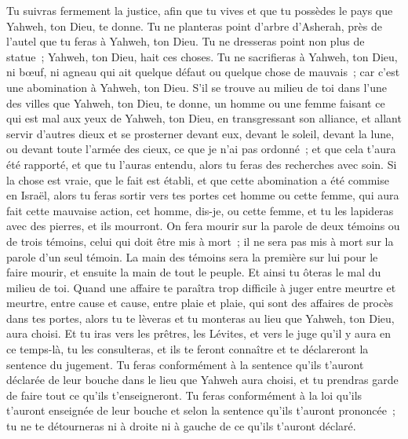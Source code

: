 \begin{multicols}{2}
Tu suivras fermement la justice, afin que tu vives et que tu possèdes le pays que Yahweh, ton Dieu, te donne.
Tu ne planteras point d'arbre d'Asherah, près de l'autel que tu feras à Yahweh, ton Dieu.
Tu ne dresseras point non plus de statue~; Yahweh, ton Dieu, hait ces choses.
\VerseOne{}Tu ne sacrifieras à Yahweh, ton Dieu, ni bœuf, ni agneau qui ait quelque défaut ou quelque chose de mauvais~; car c'est une abomination à Yahweh, ton Dieu.
S'il se trouve au milieu de toi dans l'une des villes que Yahweh, ton Dieu, te donne, un homme ou une femme faisant ce qui est mal aux yeux de Yahweh, ton Dieu, en transgressant son alliance,
et allant servir d'autres dieux et se prosterner devant eux, devant le soleil, devant la lune, ou devant toute l'armée des cieux, ce que je n'ai pas ordonné~;
et que cela t'aura été rapporté, et que tu l'auras entendu, alors tu feras des recherches avec soin. Si la chose est vraie, que le fait est établi, et que cette abomination a été commise en Israël,
alors tu feras sortir vers tes portes cet homme ou cette femme, qui aura fait cette mauvaise action, cet homme, dis-je, ou cette femme, et tu les lapideras avec des pierres, et ils mourront.
On fera mourir sur la parole de deux témoins ou de trois témoins, celui qui doit être mis à mort~; il ne sera pas mis à mort sur la parole d'un seul témoin.
La main des témoins sera la première sur lui pour le faire mourir, et ensuite la main de tout le peuple. Et ainsi tu ôteras le mal du milieu de toi.
Quand une affaire te paraîtra trop difficile à juger entre meurtre et meurtre, entre cause et cause, entre plaie et plaie, qui sont des affaires de procès dans tes portes, alors tu te lèveras et tu monteras au lieu que Yahweh, ton Dieu, aura choisi.
Et tu iras vers les prêtres, les Lévites, et vers le juge qu'il y aura en ce temps-là, tu les consulteras, et ils te feront connaître et te déclareront la sentence du jugement.
Tu feras conformément à la sentence qu'ils t'auront déclarée de leur bouche dans le lieu que Yahweh aura choisi, et tu prendras garde de faire tout ce qu'ils t'enseigneront.
Tu feras conformément à la loi qu'ils t'auront enseignée de leur bouche et selon la sentence qu'ils t'auront prononcée~; tu ne te détourneras ni à droite ni à gauche de ce qu'ils t'auront déclaré.

\end{multicols}
